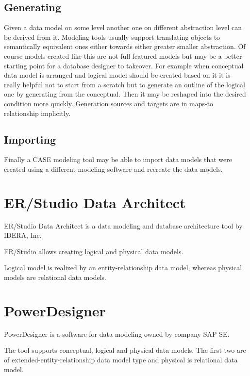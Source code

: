 \subsection{Generating}
Given a data model on some level another one on different abstraction level can be derived from it. Modeling tools usually support translating objects to semantically equivalent ones either towards either greater smaller abstraction. Of course models created like this are not full-featured models but may be a better starting point for a database designer to takeover. For example when conceptual data model is arranged and logical model should be created based on it it is really helpful not to start from a scratch but to generate an outline of the logical one by generating from the conceptual. Then it may be reshaped into the desired condition more quickly. Generation sources and targets are in maps-to relationship implicitly.

\subsection{Importing}
Finally a CASE modeling tool may be able to import data models that were created using a different modeling software and recreate the data models.

\section{ER/Studio Data Architect}

ER/Studio Data Architect is a data modeling and database architecture tool by IDERA, Inc. 

ER/Studio allows creating logical and physical data models.

Logical model is realized by an entity-relationship data model, whereas physical models are relational data models.

\section{PowerDesigner}

PowerDesigner is a software for data modeling owned by company SAP SE.

The tool supports conceptual, logical and physical data models. 
The first two are of extended-entity-relationship data model type and physical is relational data model. 
